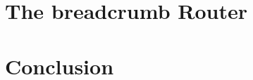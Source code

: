 \documentclass{sig-alternate}
\begin{document}






\section{The {\sc breadcrumb} Router}



%
%




%
%
\section{Conclusion}




%
%
%
%
%
%
%
%
%
%



\end{document}
